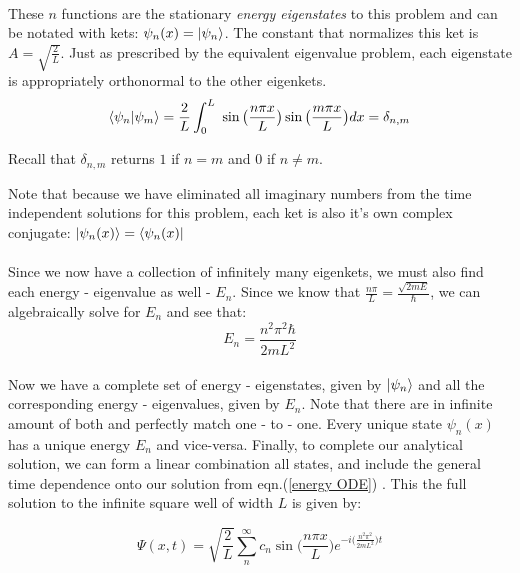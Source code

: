 \documentclass[12pt,letterpaper]{book}
\begin{document}
\paragraph*{}These $n$ functions are the stationary \textit{energy eigenstates} to this problem and can be notated with kets: $\psi_n(x) = \ket{\psi_n}$. The constant that normalizes this ket is $ A = \sqrt{\frac{2}{L}}$. Just as prescribed by the equivalent eigenvalue problem, each eigenstate is appropriately orthonormal to the other eigenkets. 
\begin{equation}
\braket{\psi_n}{\psi_m} = \frac{2}{L}\int_0^L \
\sin\big( \frac{n\pi x}{L} \big) \sin\big( \frac{m\pi x}{L} \big) dx =
\delta_{n,m}
\end{equation}
\begin{flushright}
Recall that $\delta_{n,m}$ returns $1$ if $n = m$ and $0$ if $n \neq m$.
\end{flushright}
Note that because we have eliminated all imaginary numbers from the time independent solutions for this problem, each ket is also it's own complex conjugate: $\ket{\psi_n(x)} = \bra{\psi_n(x)}$

\paragraph*{}Since we now have a collection of infinitely many eigenkets, we must also find each energy - eigenvalue as well - $E_n$. Since we know that $\frac{n\pi}{L} = \frac{\sqrt{2mE}}{\hbar}$, we can algebraically solve for $E_n$ and see that:
\begin{equation}
\label{energy for ISW}
E_n = \frac{n^2 \pi^2 \hbar}{2mL^2}
\end{equation}

\paragraph*{}Now we have a complete set of energy - eigenstates, given by $\ket{\psi_n}$ and all the corresponding energy - eigenvalues, given by $E_n$. Note that there are in infinite amount of both and perfectly match one - to - one. Every unique state $\psi_n(x)$ has a unique energy $E_n$ and vice-versa. Finally, to complete our analytical solution, we can form a linear combination all states, and include the general time dependence onto our solution from eqn.(\ref{energy ODE}) . This the full solution to the infinite square well of width $L$ is given by:

\begin{equation}
\label{ISW Full Solution}
\Psi(x,t) = \sqrt{\frac{2}{L}} \sum_n^{\infty} 
c_n \sin \Big( \frac{n\pi x}{L} \Big)
e^{-i\big( \frac{n^2 \pi^2}{2mL^2} \big)t}
\end{equation} 
\end{document}
